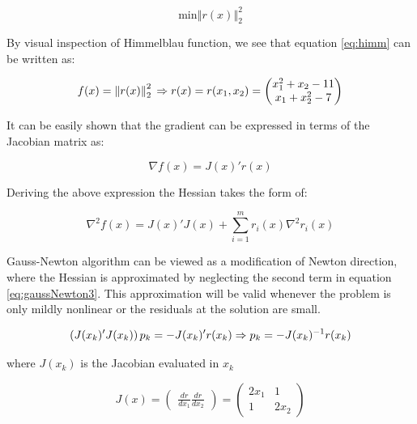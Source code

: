 \begin{equation}
\text{min} \left\Vert r(x) \right\Vert_2^2
\label{eq:leastSq}
\end{equation}

By visual inspection of Himmelblau function, we see that equation \ref{eq:himm} can be written as: 

\begin{equation}
f(x) = \left\Vert r(x) \right\Vert_2^2 \\
\Rightarrow
r(x) = r(x_1,x_2) = \begin{pmatrix}
x_1^2 + x_2 - 11 \\ x_1 + x_2^2 - 7
\end{pmatrix} 
\label{eq:gaussNewton1}
\end{equation}

It can be easily shown that the gradient can be expressed in terms of the Jacobian matrix as:

\begin{equation}
\nabla f(x) = J(x)' r(x)
\label{eq:gaussNewton2}
\end{equation}

Deriving the above expression the Hessian takes the form of:

\begin{equation}
\nabla^2 f(x) = J(x)' J(x) + \sum_{i=1}^{m} r_i(x) \nabla^2 r_i(x)
\label{eq:gaussNewton3}
\end{equation}

Gauss-Newton algorithm can be viewed as a modification of Newton direction, where the Hessian is approximated by neglecting the second term in equation \ref{eq:gaussNewton3}. This approximation will be valid whenever the problem is only mildly nonlinear or the residuals at the solution are small.

\begin{equation}
\left(J(x_k)' J(x_k)\right)  p_k = - J(x_k)' r(x_k) \\
\Rightarrow p_k = - J(x_k)^{-1} r(x_k)
\label{eq:gaussNewton4}
\end{equation}


where $J(x_k)$ is the Jacobian evaluated in $x_k$

\begin{equation}
J(x) = \begin{pmatrix}
\frac{dr}{dx_1} \frac{dr}{dx_2}
\end{pmatrix}
= \begin{pmatrix}
2 x_1 & 1 \\
1 & 2 x_2
\end{pmatrix}
\end{equation}

